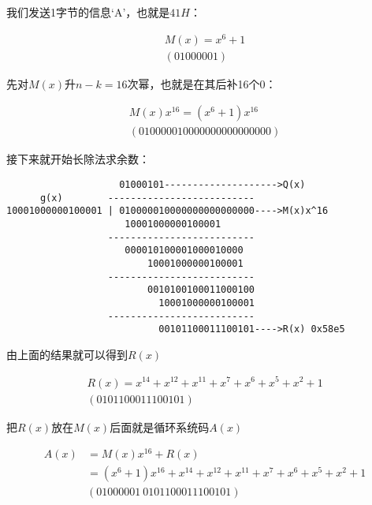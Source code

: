 \documentclass[
]{article}
\begin{document}
我们发送1字节的信息`A'，也就是$41H$：

\begin{equation}
\begin{aligned}
M(x)=x^6+1\\
(01000001)
\end{aligned}
\end{equation}

先对$M(x)$升$n-k=16$次幂，也就是在其后补16个0：

\begin{equation}
\begin{aligned}
M(x)x^{16}=(x^6+1)x^{16}\\
(010000010000000000000000)
\end{aligned}
\end{equation}

接下来就开始长除法求余数：

\begin{verbatim}
                    01000101-------------------->Q(x)
      g(x)        --------------------------
10001000000100001 | 010000010000000000000000---->M(x)x^16
                     10001000000100001
                  --------------------------
                     000010100001000010000
                         10001000000100001
                  --------------------------
                         0010100100011000100
                           10001000000100001
                  --------------------------
                           00101100011100101---->R(x) 0x58e5
\end{verbatim}

由上面的结果就可以得到$R(x)$

\begin{equation}
\begin{aligned}
R(x)=x^{14}+x^{12}+x^{11}+x^{7}+x^{6}+x^{5}+x^{2}+1\\
(0101100011100101)
\end{aligned}
\end{equation}

把$R(x)$放在$M(x)$后面就是循环系统码$A(x)$

\begin{equation}
\begin{aligned}
A(x)&=M(x)x^{16}+R(x)\\
&=(x^6+1)x^{16}+x^{14}+x^{12}+x^{11}+x^{7}+x^{6}+x^{5}+x^{2}+1\\
&(01000001 \: 0101100011100101)
\end{aligned}
\end{equation}
\end{document}
